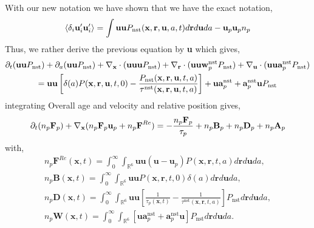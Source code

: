 With our new notation we have shown that we have the exact notation, 
\begin{equation*}
    \left<\delta_i \textbf{u}_i' \textbf{u}_i'\right>
    = 
    \int 
    \textbf{uu}
    P_\text{nst}(\textbf{x},\textbf{r},\textbf{u},a,t)
    d\textbf{r}
    d\textbf{u}
    da
    - \textbf{u}_p \textbf{u}_p n_p
\end{equation*}
Thus, we rather derive the previous equation by \textbf{u} which gives, 
\begin{multline*}
    \partial_t (\textbf{uu} P_\text{nst})
    + \partial_a (\textbf{uu} P_\text{nst})
    + {\mathbf{\nabla}_\textbf{x}} \cdot  (\textbf{uu} \textbf{u}  P_\text{nst})
    + {\mathbf{\nabla}_\textbf{r}} \cdot  (\textbf{uu}\textbf{w}^\text{nst}_p P_\text{nst})
    + {\mathbf{\nabla}_\textbf{u}} \cdot  (\textbf{uu}\textbf{a}^\text{nst}_p P_\text{nst})\\
    = \textbf{uu} 
    \left[\delta(a)  P(\textbf{x},\textbf{r}, \textbf{u},t,0)
    - \frac{P_\text{nst}(\textbf{x},\textbf{r},\textbf{u},t,a)}{\tau^\text{nst}(\textbf{x},\textbf{r},\textbf{u},t,a)}
    \right]
    + \textbf{u}\textbf{a}_p^\text{nst}
    + \textbf{a}_p^\text{nst}\textbf{u}
    P_\text{nst} 
\end{multline*}
integrating Overall age and velocity and relative position gives, 
\begin{equation*}
    \partial_t (n_p \textbf{F}_p )
    +{\mathbf{\nabla}_\textbf{x}} (n_p\textbf{F}_p \textbf{u}_p  + n_p \textbf{F}^{Re})
    = 
    - \frac{n_p \textbf{F}_p }{\tau_p}
    + n_p \textbf{B}_p
    + n_p \textbf{D}_p
    + n_p \textbf{A}_p
\end{equation*}
with, 
\begin{align*}
    n_p \textbf{F}^{Re}(\textbf{x},t)
    =
    \int_{0}^\infty
    \int_{\mathbb{R}^6}
    \textbf{uu}(\textbf{u}- \textbf{u}_p)
    P(\textbf{x},\textbf{r},t,a)
    d\textbf{r}
    d\textbf{u}
    da,\\
    n_p \textbf{B}(\textbf{x},t)
    =
    \int_{0}^\infty
    \int_{\mathbb{R}^6}
    \textbf{uu}
    P(\textbf{x},\textbf{r},t,0)\delta(a)
    d\textbf{r}
    d\textbf{u}
    da, \\
    n_p\textbf{D}(\textbf{x},t) = 
    \int_{0}^\infty
    \int_{\mathbb{R}^6} \textbf{uu}
    \left[
        \frac{1}{\tau_p(\textbf{x},t)}
        - \frac{1}{\tau^\text{nst}(\textbf{x},\textbf{r},t,a)}
    \right]
    P_\text{nst}
    d\textbf{r}
    d\textbf{u}
    da,\\
    n_p \textbf{W}(\textbf{x},t) = 
    \int_{0}^\infty
    \int_{\mathbb{R}^6} \left[
        \textbf{u} \textbf{a}^\text{nst}_p
        + \textbf{a}^\text{nst}_p\textbf{u}
    \right]P_\text{nst}
    d\textbf{r}
    d\textbf{u}
    da.
\end{align*} 
